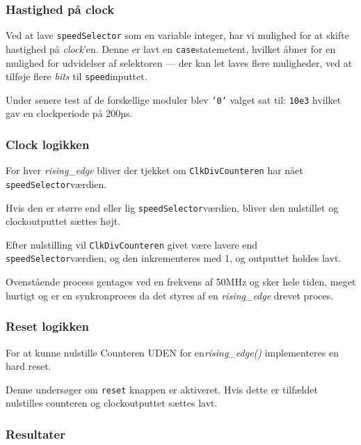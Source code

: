 {

\subsubsection*{Hastighed på clock}
Ved at lave \texttt{speedSelector} som en variable integer, har vi mulighed for at skifte hastighed på \emph{clock}'en. Denne er lavt en \texttt{case}statemetent, hvilket åbner for en mulighed for udvidelser af selektoren --- der kan let laves flere muligheder, ved at tilføje flere \emph{bits} til \texttt{speed}inputtet. 

Under senere test af de forskellige moduler blev \texttt{'0'} valget sat til: \texttt{10e3} hvilket gav en clockperiode på 200µs. 


\subsubsection*{Clock logikken}
For hver \emph{rising\_edge} bliver der tjekket om \texttt{ClkDivCounteren} har nået \texttt{speedSelector}værdien.

Hvis den er større end eller lig \texttt{speedSelector}værdien, bliver den nulstillet og clockoutputtet sættes højt.

Efter nulstilling vil \texttt{ClkDivCounteren} givet være lavere end \texttt{speedSelector}værdien, og den inkrementeres med 1, og outputtet holdes lavt.

Ovenstående process gentages ved en frekvens af 50MHz og sker hele tiden, meget hurtigt og er en synkronproces da det styres af en \emph{rising\_edge} drevet proces.

\subsubsection*{Reset logikken}
For at kunne nulstille Counteren UDEN for en\emph{rising\_edge()} implementeres en hard reset.

Denne undersøger om \texttt{reset} knappen er aktiveret. Hvis dette er tilfældet nulstilles counteren og clockoutputtet sættes lavt.

\subsubsection{Resultater}

}
